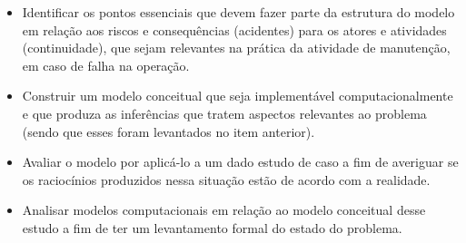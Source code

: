\begin{itemize}
    \item Identificar os pontos essenciais que devem fazer parte da estrutura do modelo em relação aos riscos e consequências (acidentes) para os atores e atividades (continuidade), que sejam relevantes na prática da atividade de manutenção, em caso de falha na operação. 
    \item Construir um modelo conceitual que seja implementável computacionalmente e que produza as inferências que tratem aspectos relevantes ao problema (sendo que esses foram levantados no item anterior).
    \item Avaliar o modelo por aplicá-lo a um dado estudo de caso a fim de averiguar se os raciocínios produzidos nessa situação estão de acordo com a realidade.  
    \item Analisar modelos computacionais em relação ao modelo conceitual desse estudo a fim de ter um levantamento formal do estado do problema.
\end{itemize}
